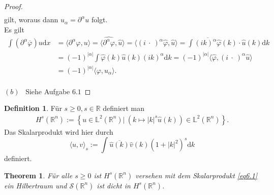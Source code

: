 \documentclass[
paper=a4,
bibtotocnumbered,
liststotocnumbered,
tablecaptionabove,
pointlessnumbers,
twoside,
openright,
10pt
]
{report}
\let\phi\varphi
\newtheorem{thm}{Theorem}[chapter]
\theoremstyle{definition}
\newtheorem*{df}{Definition}
\numberwithin{equation}{chapter}
\begin{document}
\begin{proof}
\begin{align*}
\end{align*}
gilt, woraus dann $u_\alpha = \partial^\alpha u$ folgt.
\\ Es gilt
\begin{align*}
\int \left(\partial^\alpha \overline{\phi}\right) u \mathrm{d}x &= \langle\partial^\alpha \phi, u \rangle = \langle \widehat{\partial^\alpha \phi}, \widehat{u}\rangle = \langle(i ~\cdot~)^\alpha \widehat{\phi}, \widehat{u} \rangle = \int \overline{(ik)^\alpha \widehat{\phi}}(k) \cdot\widehat{u}(k)\mathrm{d}k \\& = (-1)^{|\alpha|} \int \widehat{\phi}(k) \widehat{u}(k) (ik)^\alpha \mathrm{d}k = (-1)^{|\alpha|} \langle \widehat{\phi},(i ~\cdot~)^\alpha \widehat{u} \rangle 
\\& = (-1)^{|\alpha|} \langle\phi, u_\alpha\rangle.
\end{align*}
\ 
\\$(b) $ \ Siehe Aufgabe $6.1$
\end{proof}
\begin{df}
Für $s \geq 0, s \in \mathbb R$ definiert man
\begin{align*}
H^s (\mathbb{R}^n):= \left\{ u \in \mathbb{L}^2(\mathbb{R}^n) | \ (k \mapsto |k|^s \widehat{u}(k)) \in \mathbb{L}^2(\mathbb{R}^n) \right\}.
\end{align*}
Das Skalarprodukt wird hier durch
\begin{equation}\label{eq6.1}
\langle u,v\rangle_s := \int \overline{\widehat{u}(k)}\widehat{v}(k)(1+|k|^2)^s \mathrm{d}k 
\end{equation}
definiert.
\end{df}
\begin{thm}
Für alle $s\ge 0$ ist $H^s(\mathbb R^n)$ versehen mit dem Skalarprodukt \eqref{eq6.1} ein Hilbertraum und $\mathcal S(\mathbb R^n)$ ist dicht in $H^s(\mathbb R^n)$. 
\end{thm}
\end{document}
